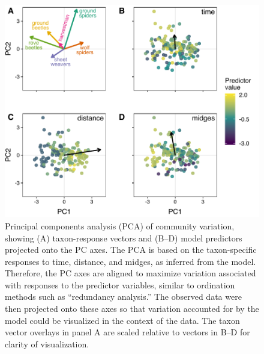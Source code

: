 \documentclass[12pt]{article}
\begin{document}
\begin{figure}
\centering
\includegraphics{fig3.pdf}
\caption{\label{fig:pca}
Principal components analysis (PCA) of community variation, showing
(A) taxon-response vectors and (B--D) model predictors projected onto the PC axes.
The PCA is based on the taxon-specific responses to time, distance, and midges,
as inferred from the model.
Therefore, the PC axes are aligned to maximize variation associated with responses
to the predictor variables, similar to ordination methods such as ``redundancy analysis.''
The observed data were then projected onto these axes so that variation accounted for
by the model could be visualized in the context of the data.
The taxon vector overlays in panel A are scaled relative to vectors in
B--D for clarity of visualization.
}
\end{figure}


\clearpage


\renewcommand{\thefigure}{S\arabic{figure}}
\renewcommand{\theequation}{S\arabic{equation}}
\renewcommand{\thetable}{S\arabic{table}}
\setcounter{equation}{0}
\setcounter{figure}{0}
\setcounter{table}{0}
\end{document}
